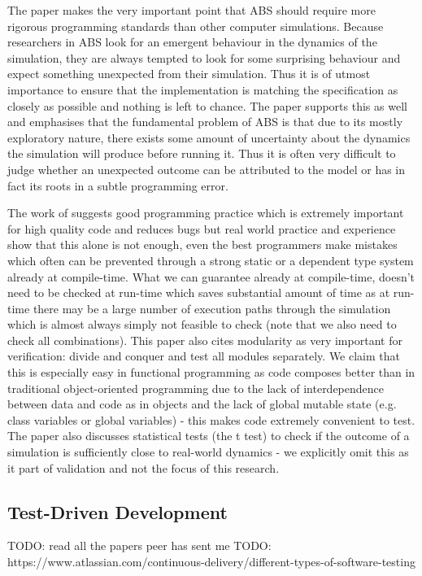 The paper \cite{polhill_ghost_2005} makes the very important point that ABS should require more rigorous programming standards than other computer simulations. Because researchers in ABS look for an emergent behaviour in the dynamics of the simulation, they are always tempted to look for some surprising behaviour and expect something unexpected from their simulation. Thus it is of utmost importance to ensure that the implementation is matching the specification as closely as possible and nothing is left to chance. The paper \cite{galan_errors_2009} supports this as well and emphasises that the fundamental problem of ABS is that due to its mostly exploratory nature, there exists some amount of uncertainty about the dynamics the simulation will produce before running it. Thus it is often very difficult to judge whether an unexpected outcome can be attributed to the model or has in fact its roots in a subtle programming error.

The work of \cite{kleijnen_verification_1995} suggests good programming practice which is extremely important for high quality code and reduces bugs but real world practice and experience show that this alone is not enough, even the best programmers make mistakes which often can be prevented through a strong static or a dependent type system already at compile-time. What we can guarantee already at compile-time, doesn't need to be checked at run-time which saves substantial amount of time as at run-time there may be a large number of execution paths through the simulation which is almost always simply not feasible to check (note that we also need to check all combinations). This paper also cites modularity as very important for verification: divide and conquer and test all modules separately. We claim that this is especially easy in functional programming as code composes better than in traditional object-oriented programming due to the lack of interdependence between data and code as in objects and the lack of global mutable state (e.g. class variables or global variables) - this makes code extremely convenient to test. The paper also discusses statistical tests (the t test) to check if the outcome of a simulation is sufficiently close to real-world dynamics - we explicitly omit this as it part of validation and not the focus of this research.

\subsection{Test-Driven Development}
TODO: read all the papers peer has sent me
TODO: https://www.atlassian.com/continuous-delivery/different-types-of-software-testing

